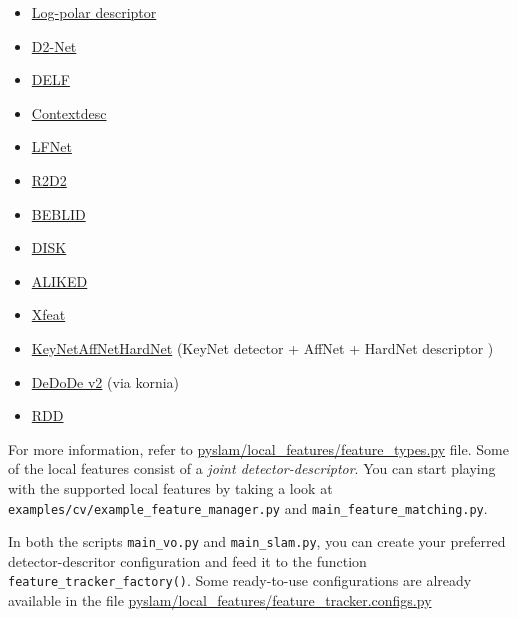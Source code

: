\documentclass{article}
\begin{document}
\begin{itemize}
    \item \href{https://github.com/cvlab-epfl/log-polar-descriptors}{Log-polar descriptor} \cite{LogPolarDescriptor}
    \item \href{https://github.com/mihaidusmanu/d2-net}{D2-Net} \cite{dusmanu2019d2}
    \item \href{https://github.com/tensorflow/models/tree/master/research/delf}{DELF} \cite{noh2017large}
    \item \href{https://github.com/lzx551402/contextdesc}{Contextdesc} \cite{luo2020contextdesc}
    \item \href{https://github.com/vcg-uvic/lf-net-release}{LFNet} \cite{ono2018lf}
    \item \href{https://github.com/naver/r2d2}{R2D2} \cite{revaud2019r2d2}
    \item \href{https://raw.githubusercontent.com/iago-suarez/BEBLID/master/BEBLID_Boosted_Efficient_Binary_Local_Image_Descriptor.pdf}{BEBLID} \cite{BEBLID}
    \item \href{https://arxiv.org/abs/2006.13566}{DISK} \cite{tyszkiewicz2020disk}
    \item \href{https://arxiv.org/abs/2304.03608}{ALIKED} \cite{barroso2023alike}
    \item \href{https://arxiv.org/abs/2404.19174}{Xfeat} \cite{barroso2024xfeat}
    \item \href{https://github.com/axelBarroso/Key.Net}{KeyNetAffNetHardNet} (KeyNet detector \cite{barroso2020key} + AffNet + HardNet descriptor \cite{mishchuk2017working})
    \item \href{https://github.com/Parskatt/DeDoDe}{DeDoDe v2} \cite{edstedt2024dedode,edstedt2024dedodev2} (via kornia)
    \item \href{https://github.com/xtcpete/rdd}{RDD} \cite{chen2025rdd}
\end{itemize}

For more information, refer to \href{https://github.com/luigifreda/pyslam/blob/master/pyslam/local_features/feature_types.py}{pyslam/local\_features/feature\_types.py}
file. Some of the local features consist of a \emph{joint
detector-descriptor}. You can start playing with the supported local
features by taking a look at \texttt{examples/cv/example\_feature\_manager.py}
and \texttt{main\_feature\_matching.py}.

In both the scripts \texttt{main\_vo.py} and \texttt{main\_slam.py}, you
can create your preferred detector-descritor configuration and feed it
to the function \texttt{feature\_tracker\_factory()}. Some ready-to-use
configurations are already available in the file
\href{https://github.com/luigifreda/pyslam/blob/master/pyslam/local_features/feature_tracker_configs.py}{pyslam/local\_features/feature\_tracker.configs.py}
\end{document}
